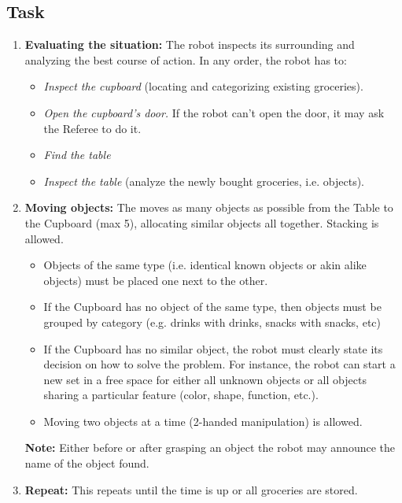 \subsection{Task}
\begin{enumerate}
	\item \textbf{Evaluating the situation:} The robot inspects its surrounding and analyzing the best course of action. In any order, the robot has to:
	\begin{itemize}
		\item \textit{Inspect the cupboard} (locating and categorizing existing groceries).
		\item \textit{Open the cupboard's door.} If the robot can't open the door, it may ask the Referee to do it.
		\item \textit{Find the table}
		\item \textit{Inspect the table} (analyze the newly bought groceries, i.e. objects).
	\end{itemize}

	\item \textbf{Moving objects:} The moves as many objects as possible from the Table to the Cupboard (max 5), allocating similar objects all together.
	Stacking is allowed.
	\begin{itemize}
		\item Objects of the same type (i.e. identical known objects or akin alike objects) must be placed one next to the other.
		\item If the Cupboard has no object of the same type, then objects must be grouped by category (e.g. drinks with drinks, snacks with snacks, etc)
		\item If the Cupboard has no similar object, the robot must clearly state its decision on how to solve the problem. For instance, the robot can start a new set in a free space for either all unknown objects or all objects sharing a particular feature (color, shape, function, etc.).
		\item Moving two objects at a time (2-handed manipulation) is allowed.
	\end{itemize}

	\textbf{Note:} Either before or after grasping an object the robot may announce the name of the object found.
	\item \textbf{Repeat:} This repeats until the time is up or all groceries are stored.
\end{enumerate}


%
%
